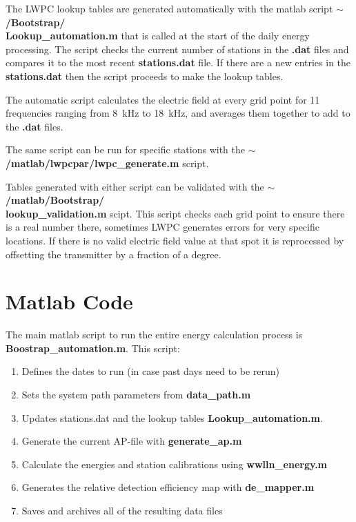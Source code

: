 The LWPC lookup tables are generated automatically with the matlab script {\bf $\sim$/Bootstrap/\\Lookup\_automation.m} that is called at the start of the daily energy processing.
The script checks the current number of stations in the \textbf{.dat} files and compares it to the most recent \textbf{stations.dat} file.
If there are a new entries in the \textbf{stations.dat} then the script proceeds to make the lookup tables.

The automatic script calculates the electric field at every grid point for 11 frequencies ranging from 8~kHz to 18~kHz, and averages them together to add to the \textbf{.dat} files.

The same script can be run for specific stations with the \textbf{$\sim$/matlab/lwpcpar/lwpc\_generate.m} script.

Tables generated with either script can be validated with the \textbf{$\sim$/matlab/Bootstrap/\\lookup\_validation.m} scipt.
This script checks each grid point to ensure there is a real number there, sometimes LWPC generates errors for very specific locations.
If there is no valid electric field value at that spot it is reprocessed by offsetting the transmitter by a fraction of a degree.

\section{Matlab Code}

The main matlab script to run the entire energy calculation process is {\bf Boostrap\_automation.m}.
This script:
\begin{enumerate}
\item{Defines the dates to run (in case past days need to be rerun)}
\item{Sets the system path parameters from {\bf data\_path.m}}
\item{Updates stations.dat and the lookup tables {\bf Lookup\_automation.m}.}
\item{Generate the current AP-file with {\bf generate\_ap.m}}
\item{Calculate the energies and station calibrations using {\bf wwlln\_energy.m}}
\item{Generates the relative detection efficiency map with {\bf de\_mapper.m}}
\item{Saves and archives all of the resulting data files}
\end{enumerate}

